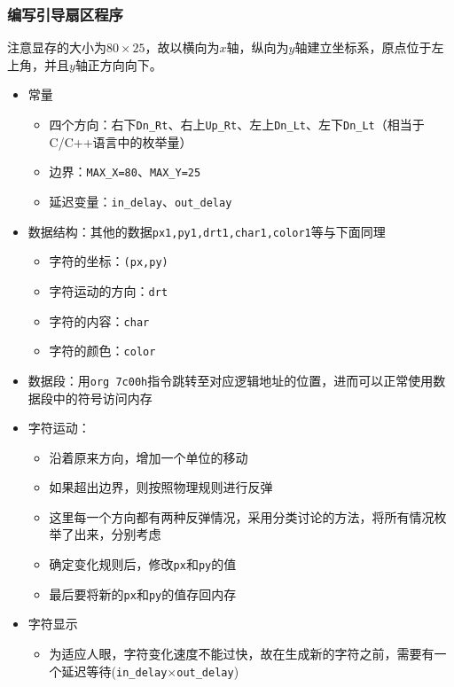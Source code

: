 \documentclass[logo,reportComp]{thesis}
\begin{document}
\subsubsection{编写引导扇区程序}
注意显存的大小为$80\times 25$，故以横向为$x$轴，纵向为$y$轴建立坐标系，原点位于左上角，并且$y$轴正方向向下。
\begin{itemize}
	\item 常量
	\begin{itemize}
		\item 四个方向：右下\verb'Dn_Rt'、右上\verb'Up_Rt'、左上\verb'Dn_Lt'、左下\verb'Dn_Lt'（相当于C/C++语言中的枚举量）
		\item 边界：\verb'MAX_X=80'、\verb'MAX_Y=25'
		\item 延迟变量：\verb'in_delay'、\verb'out_delay'
	\end{itemize}
	\item 数据结构：其他的数据\verb'px1,py1,drt1,char1,color1'等与下面同理
	\begin{itemize}
		\item 字符的坐标：\verb'(px,py)'
		\item 字符运动的方向：\verb'drt'
		\item 字符的内容：\verb'char'
		\item 字符的颜色：\verb'color'
	\end{itemize}
	\item 数据段：用\verb'org 7c00h'指令跳转至对应逻辑地址的位置，进而可以正常使用数据段中的符号访问内存
	\item 字符运动：
	\begin{itemize}
		\item 沿着原来方向，增加一个单位的移动
		\item 如果超出边界，则按照物理规则进行反弹
		\item 这里每一个方向都有两种反弹情况，采用分类讨论的方法，将所有情况枚举了出来，分别考虑
		\item 确定变化规则后，修改\verb'px'和\verb'py'的值
		\item 最后要将新的\verb'px'和\verb'py'的值存回内存
	\end{itemize}
	\item 字符显示
	\begin{itemize}
		\item 为适应人眼，字符变化速度不能过快，故在生成新的字符之前，需要有一个延迟等待(\verb'in_delay'$\times$\verb'out_delay')

\end{itemize}
\end{itemize}
\end{document}
